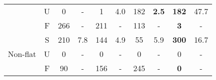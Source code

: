 \begin{table}[ht]
\begin{tabular}{|c|c|c|c|c|c|c|c|c|c|}
        \cline{2-10}
         & U & 0 & - & 1 & 4.0 & 182 & {\bf 2.5} & {\bf 182} & 47.7 \\
         \cline{2-10}
         & F & 266 & - & 211 & - & 113 & - & {\bf 3} & - \\ \hline
         \cline{1-10}
        \multirow{3}{*}{\scriptsize{Non-flat}}
         & S & 210 & 7.8 & 144 & 4.9 & 55 & 5.9 &{\bf 300} & 16.7 \\
        \cline{2-10}
         & U & 0 & - & 0 & - & 0 & - & 0 & - \\
         \cline{2-10}
         & F & 90 & - & 156 & - & 245 & - & {\bf 0} & - \\ \hline
         \cline{1-10}
        \end{tabular}
            \label{table:arithmetic}
\end{table}